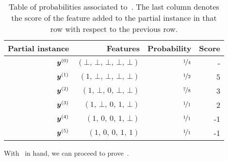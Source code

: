 \begin{example}
\begin{table}
\centering
\begin{tabular}{rrrr}
    Partial instance & Features & Probability & Score \\ \midrule 
${\bm{y}}^{(0)}$  & $(\bot, \,\bot, \,\bot, \,\bot, \,\bot)$ & $\nicefrac{ 1 }{ 4 }$ & - \\
${\bm{y}}^{(1)}$  &$(1, \,\bot, \,\bot, \,\bot, \,\bot)$ & $\nicefrac{ 1 }{ 2 }$ & 5\\
${\bm{y}}^{(2)}$  &$(1, \,\bot, \,0, \,\bot, \,\bot)$ & $\nicefrac{ 7 }{ 8 }$ & 3\\
${\bm{y}}^{(3)}$ & $(1, \,\bot, \,0, \,1, \,\bot)$ & $\nicefrac{ 1 }{ 1 }$ & 2 \\
${\bm{y}}^{(4)}$ &$(1, \,0, \,0, \,1, \,\bot)$ & $\nicefrac{ 1 }{ 1 }$ & -1 \\
${\bm{y}}^{(5)}$ & $(1, \,0, \,0, \,1, \,1)$ & $\nicefrac{ 1 }{ 1 }$ & -1\\
\bottomrule
\end{tabular}
\caption{Table of probabilities associated to~. The last column denotes the score of the feature added to the partial instance in that row with respect to the previous row.}\label{table:ex-greedy1}
\end{table}
\end{example}


With~ in hand, we can proceed to prove~.





